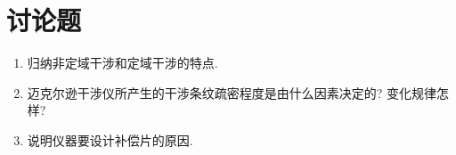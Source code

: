 \documentclass[signature=data]{physicsreport}
\begin{document}
\section{讨论题}
\begin{enumerate}
    \item 归纳非定域干涉和定域干涉的特点.
    \vspace{3cm}
    \item 迈克尔逊干涉仪所产生的干涉条纹疏密程度是由什么因素决定的? 变化规律怎样?
    \vspace{3cm}
    \item 说明仪器要设计补偿片的原因.
\end{enumerate}
\end{document}
